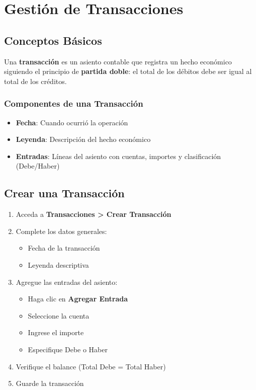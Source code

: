 \chapter{Gestión de Transacciones}

\section{Conceptos Básicos}

Una \textbf{transacción} es un asiento contable que registra un hecho económico siguiendo el principio de \textbf{partida doble}: el total de los débitos debe ser igual al total de los créditos.

\subsection{Componentes de una Transacción}

\begin{itemize}
    \item \textbf{Fecha}: Cuando ocurrió la operación
    \item \textbf{Leyenda}: Descripción del hecho económico
    \item \textbf{Entradas}: Líneas del asiento con cuentas, importes y clasificación (Debe/Haber)
\end{itemize}

\section{Crear una Transacción}

\begin{enumerate}
    \item Acceda a \textbf{Transacciones > Crear Transacción}
    \item Complete los datos generales:
    \begin{itemize}
        \item Fecha de la transacción
        \item Leyenda descriptiva
    \end{itemize}
    \item Agregue las entradas del asiento:
    \begin{itemize}
        \item Haga clic en \textbf{Agregar Entrada}
        \item Seleccione la cuenta
        \item Ingrese el importe
        \item Especifique Debe o Haber
    \end{itemize}
    \item Verifique el balance (Total Debe = Total Haber)
    \item Guarde la transacción
\end{enumerate}

